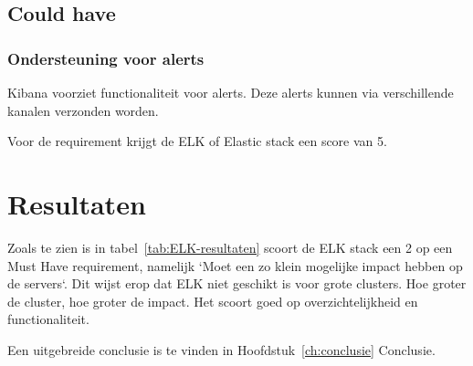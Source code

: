 \subsection{Could have}
\subsubsection{Ondersteuning voor alerts}
Kibana voorziet functionaliteit voor alerts. Deze alerts kunnen via verschillende kanalen verzonden worden. 

Voor de requirement krijgt de ELK of Elastic stack een score van 5.

\section{Resultaten}
Zoals te zien is in tabel~\ref{tab:ELK-resultaten} scoort de ELK stack een 2 op een Must Have requirement, namelijk `Moet een zo klein mogelijke impact hebben op de servers`. Dit wijst erop dat ELK niet geschikt is voor grote clusters. Hoe groter de cluster, hoe groter de impact. Het scoort goed op overzichtelijkheid en functionaliteit. 

Een uitgebreide conclusie is te vinden in Hoofdstuk~\ref{ch:conclusie} Conclusie.

